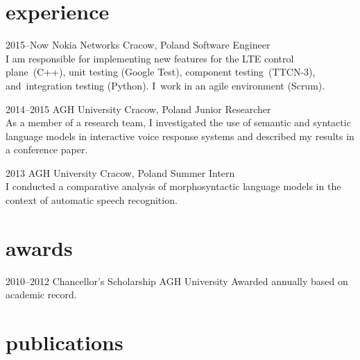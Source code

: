 \documentclass[]{friggeri-cv} %
\begin{document}

\section{experience}
\begin{entrylist}

\entry
{2015--Now}
{Nokia Networks}
{Cracow, Poland}
{Software Engineer \\
  I am responsible for implementing new features for the LTE control plane~(C++), unit testing (Google Test), component testing~(TTCN-3), and~integration testing (Python). I~work in an agile environment (Scrum).\\}

\entry
{2014--2015}
{AGH University}
{Cracow, Poland}
{Junior Researcher \\
  As a member of a research team, I investigated the use of semantic and syntactic language models in interactive voice response systems and described my results in a conference paper.\\}

\entry
{2013}
{AGH University}
{Cracow, Poland}
{Summer Intern \\
  I conducted a comparative analysis of morphosyntactic language models in the context of automatic speech recognition.}

\end{entrylist}


\section{awards}

\begin{entrylist}

\entry
{2010--2012}
{Chancellor's Scholarship}
{AGH University}
{Awarded annually based on academic record.}
\end{entrylist}


\section{publications}

\end{document}
